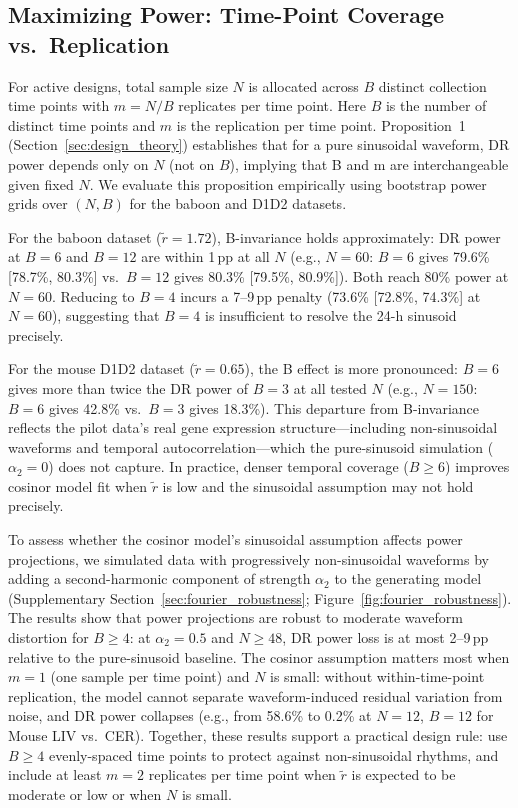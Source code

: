 \documentclass{article}
\begin{document}
\subsection{Maximizing Power: Time-Point Coverage vs.\ Replication}

For active designs, total sample size $N$ is allocated across $B$ distinct collection time points with $m = N/B$ replicates per time point. Here $B$ is the number of distinct time points and $m$ is the replication per time point. Proposition~1 (Section~\ref{sec:design_theory}) establishes that for a pure sinusoidal waveform, DR power depends only on $N$ (not on $B$), implying that B and m are interchangeable given fixed $N$. We evaluate this proposition empirically using bootstrap power grids over $(N, B)$ for the baboon and D1D2 datasets.

For the baboon dataset ($\tilde{r} = 1.72$), B-invariance holds approximately: DR power at $B = 6$ and $B = 12$ are within 1\,pp at all $N$ (e.g., $N = 60$: $B = 6$ gives 79.6\% [78.7\%, 80.3\%] vs.\ $B = 12$ gives 80.3\% [79.5\%, 80.9\%]). Both reach 80\% power at $N = 60$. Reducing to $B = 4$ incurs a 7--9\,pp penalty (73.6\% [72.8\%, 74.3\%] at $N = 60$), suggesting that $B = 4$ is insufficient to resolve the 24-h sinusoid precisely.

For the mouse D1D2 dataset ($\tilde{r} = 0.65$), the B effect is more pronounced: $B = 6$ gives more than twice the DR power of $B = 3$ at all tested $N$ (e.g., $N = 150$: $B = 6$ gives 42.8\% vs.\ $B = 3$ gives 18.3\%). This departure from B-invariance reflects the pilot data's real gene expression structure---including non-sinusoidal waveforms and temporal autocorrelation---which the pure-sinusoid simulation ($\alpha_2 = 0$) does not capture. In practice, denser temporal coverage ($B \geq 6$) improves cosinor model fit when $\tilde{r}$ is low and the sinusoidal assumption may not hold precisely.

To assess whether the cosinor model's sinusoidal assumption affects power projections, we simulated data with progressively non-sinusoidal waveforms by adding a second-harmonic component of strength $\alpha_2$ to the generating model (Supplementary Section~\ref{sec:fourier_robustness}; Figure~\ref{fig:fourier_robustness}). The results show that power projections are robust to moderate waveform distortion for $B \geq 4$: at $\alpha_2 = 0.5$ and $N \geq 48$, DR power loss is at most 2--9\,pp relative to the pure-sinusoid baseline. The cosinor assumption matters most when $m = 1$ (one sample per time point) and $N$ is small: without within-time-point replication, the model cannot separate waveform-induced residual variation from noise, and DR power collapses (e.g., from 58.6\% to 0.2\% at $N = 12$, $B = 12$ for Mouse LIV vs.\ CER). Together, these results support a practical design rule: use $B \geq 4$ evenly-spaced time points to protect against non-sinusoidal rhythms, and include at least $m = 2$ replicates per time point when $\tilde{r}$ is expected to be moderate or low or when $N$ is small.
\end{document}
